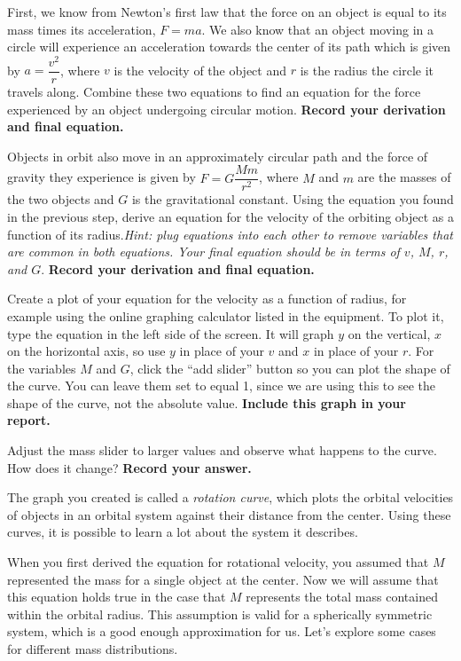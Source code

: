 \begin{steps}
	\item First, we know from Newton's first law that the force on an object is equal to its mass times its acceleration, $F=ma$. We also know that an object moving in a circle will experience an acceleration towards the center of its path which is given by $a = \dfrac{v^2}{r}$, where $v$ is the velocity of the object and $r$ is the radius the circle it travels along. Combine these two equations to find an equation for the force experienced by an object undergoing circular motion. \textbf{Record your derivation and final equation.}
	
	\item Objects in orbit also move in an approximately circular path and the force of gravity they experience is given by $F = G\dfrac{Mm}{r^2}$, where $M$ and $m$ are the masses of the two objects and $G$ is the gravitational constant. Using the equation you found in the previous step, derive an equation for the velocity of the orbiting object as a function of its radius.\textit{Hint: plug equations into each other to remove variables that are common in both equations. Your final equation should be in terms of $v$, $M$, $r$, and $G$}. \textbf{Record your derivation and final equation.}
	
	\item Create a plot of your equation for the velocity as a function of radius, for example using the online graphing calculator listed in the equipment. To plot it, type the equation in the left side of the screen. It will graph $y$ on the vertical, $x$ on the horizontal axis, so use $y$ in place of your $v$ and $x$ in place of your $r$. For the variables $M$ and $G$, click the ``add slider'' button so you can plot the shape of the curve. You can leave them set to equal 1, since we are using this to see the shape of the curve, not the absolute value. \textbf{Include this graph in your report.}

	\item Adjust the mass slider to larger values and observe what happens to the curve. How does it change? \textbf{Record your answer.}
\end{steps}

The graph you created is called a \textit{rotation curve}, which plots the orbital velocities of objects in an orbital system against their distance from the center. Using these curves, it is possible to learn a lot about the system it describes.

When you first derived the equation for rotational velocity, you assumed that $M$ represented the mass for a single object at the center. Now we will assume that this equation holds true in the case that $M$ represents the total mass contained within the orbital radius. This assumption is valid for a spherically symmetric system, which is a good enough approximation for us. Let's explore some cases for different mass distributions.

